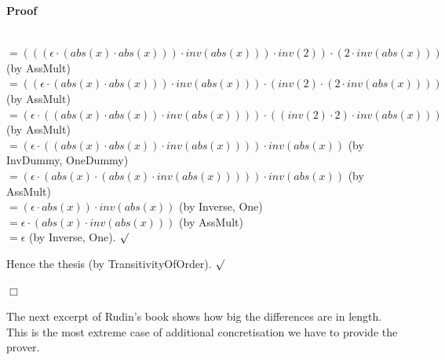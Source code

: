 \documentclass{article}
\newenvironment{forthel}{\begin{leftbar}}{\end{leftbar}}
\newenvironment{proof}{\noindent\textbf{Proof\ }}{\hspace*{\fill}$\Box$\medskip}
\newenvironment{subproof}{\begin{list}{}{}
		\item[\text{Proof}]}{\hfill $\surd$ \end{list}}
\newcommand{\dotequal}{=}
\begin{document}
\begin{forthel}
\begin{proof}
\begin{subproof}
\begin{subproof}
	\\$\dotequal (((\epsilon \cdot (abs(x) \cdot abs(x))) \cdot inv(abs(x))) \cdot inv(2)) \cdot (2 \cdot inv(abs(x)))$ (by AssMult)
	\\$\dotequal ((\epsilon \cdot (abs(x) \cdot abs(x))) \cdot inv(abs(x))) \cdot (inv(2) \cdot (2 \cdot inv(abs(x))))$ (by AssMult)
	\\$\dotequal (\epsilon \cdot ((abs(x) \cdot abs(x)) \cdot inv(abs(x)))) \cdot ((inv(2) \cdot 2) \cdot inv(abs(x)))$ (by AssMult)
	\\$\dotequal (\epsilon \cdot ((abs(x) \cdot abs(x)) \cdot inv(abs(x)))) \cdot inv(abs(x))$ (by InvDummy, OneDummy)
	\\$\dotequal (\epsilon \cdot (abs(x) \cdot (abs(x) \cdot inv(abs(x))))) \cdot inv(abs(x))$ (by AssMult)
	\\$\dotequal (\epsilon \cdot abs(x)) \cdot inv(abs(x))$ (by Inverse, One)
	\\$\dotequal \epsilon \cdot (abs(x) \cdot inv(abs(x)))$ (by AssMult)
	\\$\dotequal \epsilon$ (by Inverse, One).
	\end{subproof}
	Hence the thesis (by TransitivityOfOrder).
	\end{subproof}
	\end{proof}
\end{forthel}

\noindent The next excerpt of Rudin's book shows how big the differences are in length. This is the most extreme case of additional concretisation we have to provide the prover.

\\
\end{document}
